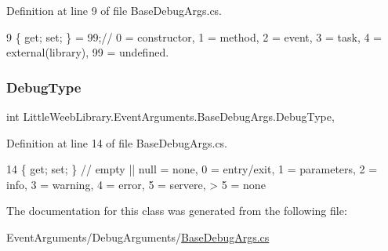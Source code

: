 Definition at line 9 of file Base\+Debug\+Args.\+cs.


\begin{DoxyCode}
9 \{ \textcolor{keyword}{get}; \textcolor{keyword}{set}; \} = 99;\textcolor{comment}{// 0 = constructor, 1 = method, 2 = event, 3 = task, 4 = external(library), 99 =
       undefined.}
\end{DoxyCode}
\mbox{\label{class_little_weeb_library_1_1_event_arguments_1_1_base_debug_args_aa2822d085deabfeb175824f22a114f1f}} 
\subsubsection{\texorpdfstring{Debug\+Type}{DebugType}}
{\footnotesize\ttfamily int Little\+Weeb\+Library.\+Event\+Arguments.\+Base\+Debug\+Args.\+Debug\+Type\hspace{0.3cm}{\ttfamily [get]}, {\ttfamily [set]}}



Definition at line 14 of file Base\+Debug\+Args.\+cs.


\begin{DoxyCode}
14 \{ \textcolor{keyword}{get}; \textcolor{keyword}{set}; \} \textcolor{comment}{// empty || null = none, 0 = entry/exit, 1 = parameters, 2 = info, 3 = warning, 4 = error, 5
       = servere, > 5 = none}
\end{DoxyCode}


The documentation for this class was generated from the following file\+:\begin{DoxyCompactItemize}
\item 
Event\+Arguments/\+Debug\+Arguments/\mbox{\hyperlink{_base_debug_args_8cs}{Base\+Debug\+Args.\+cs}}\end{DoxyCompactItemize}

